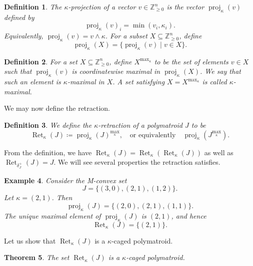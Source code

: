 \documentclass[10pt,a4paper]{amsart}
\newtheorem{theorem}{Theorem}[section]
\newtheorem{definition}[theorem]{Definition}
\newtheorem{example}[theorem]{Example}
\newcommand{\Zgeqn}{\mathbb{Z}_{\geq 0}^n}     %
\newcommand{\delplus}{\delta_J^+}
\DeclareMathOperator{\proj}{proj}              %
\newcommand{\kproj}{\proj_{\kappa}}            %
\DeclareMathOperator{\Ret}{Ret}                %
\newcommand{\RetK}{\Ret_{\kappa}}              %
\newcommand{\Jmax}{J^{\max_{\kappa}}}
\begin{document}
\begin{definition}
    The \emph{$\kappa$-projection} of a vector $v\in\Zgeqn$ is the vector $\kproj(v)$ defined by
    \[
        \kproj(v)_i=\min(v_i,\kappa_i).
    \]
    Equivalently, $\kproj(v)=v\wedge\kappa$. For a subset $X\subseteq\Zgeqn$, define
    \[
        \kproj(X)=\{\kproj(v)\mid v\in X\}.
    \]
\end{definition}

\begin{definition}
    For a set $X\subseteq\Zgeqn$, define $X^{\max_\kappa}$ to be the set of elements $v\in X$ such that $\kproj(v)$ is coordinatewise maximal in $\kproj(X)$. We say that such an element is \emph{$\kappa$-maximal in $X$}. A set satisfying $X=X^{\max_\kappa}$ is called \emph{$\kappa$-maximal}.
\end{definition}
We may now define the retraction.
\begin{definition}
    We define the \emph{$\kappa$-retraction} of a polymatroid $J$ to be \[
    \RetK(J) \coloneqq \kproj(J)^{\max_\kappa}, \quad \text{or equivalently} \quad 
    \kproj(\Jmax).
    \]
\end{definition}
From the definition, we have $\RetK(J) = \RetK(\RetK(J))$ as well as $\Ret_{\delplus}(J) = J$. We will see several properties the retraction satisfies. 


\begin{example}
    Consider the M-convex set
    \[
        J = \{(3,0),(2,1),(1,2)\}.
    \]
    Let $\kappa=(2,1)$. Then
    \[
        \kproj(J)=\{(2,0),(2,1),(1,1)\}.
    \]
    The unique maximal element of $\kproj(J)$ is $(2,1)$, and hence
    \[
        \Ret_\kappa(J)=\{(2,1)\}.
    \]
\end{example}


Let us show that $\RetK(J)$ is a $\kappa$-caged polymatroid. 


\begin{theorem} \label{theorem:retraction_is_polymatroid}
    The set $\RetK(J)$ is a $\kappa$-caged polymatroid.
\end{theorem}
\end{document}
